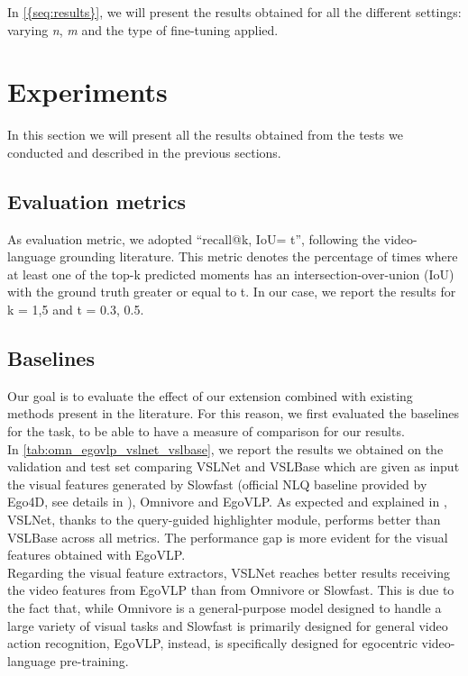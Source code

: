 \documentclass[10pt,twocolumn,letterpaper]{article}
\begin{document}
In \cref{{seq:results}}, we will present the results obtained for all the different settings: varying \textit{n}, \textit{m} and the type of fine-tuning applied.



\section{Experiments}
\label{seq:results}
In this section we will present all the results obtained from the tests we conducted and described in the previous sections.
\subsection{Evaluation metrics}
As evaluation metric, we adopted “recall@k, IoU= t”, following the video-language grounding literature. This metric denotes the percentage of times where at least one of the top-k predicted moments has an intersection-over-union (IoU) with the ground truth greater or equal to t. In our case, we report the results for k = {1,5} and t = {0.3, 0.5}.
\subsection{Baselines}
Our goal is to evaluate the effect of our extension combined with existing methods present in the literature. For this reason, we first evaluated the baselines for the task, to be able to have a measure of comparison for our results. \\
In \cref{tab:omn_egovlp_vslnet_vslbase}, we report the results we obtained on the validation and test set comparing VSLNet and VSLBase which are given as input the visual features generated by Slowfast \cite{feichtenhofer2019slowfastnetworksvideorecognition} (official NLQ baseline provided by Ego4D, see details in \cite{grauman2022ego4d}), Omnivore and EgoVLP. 
As expected and explained in \cite{zhang2020spanbasedlocalizingnetworknatural}, VSLNet, thanks to the query-guided highlighter module, performs better than VSLBase across all metrics. The performance gap is more evident for the visual features obtained with EgoVLP. \\
Regarding the visual feature extractors, VSLNet reaches better results receiving the video features from EgoVLP than from Omnivore or Slowfast. This is due to the fact that, while Omnivore is a general-purpose model designed to handle a large variety of visual tasks and Slowfast is primarily designed for general video action recognition, EgoVLP, instead, is specifically designed for egocentric video-language pre-training.
\end{document}
